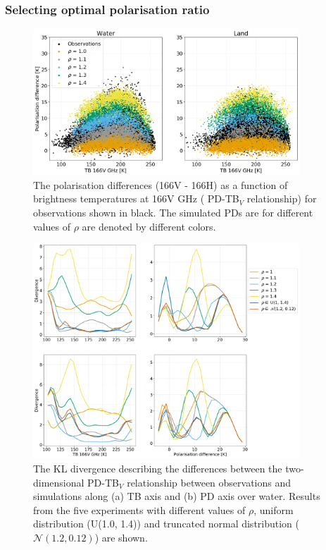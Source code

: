 \documentclass[amt, manuscript]{copernicus}
\begin{document}
\subsubsection{Selecting optimal polarisation ratio}
%
\label{sec:polratio_selection}
\begin{figure}[t]
	\includegraphics[width=10cm]{Figures/PD_water_varying_rho_water_land.png}
	\caption{The polarisation differences (166V - 166H) as a function of brightness temperatures at 166V GHz ( PD-TB$_V$ relationship) for observations shown in black. The simulated PDs are for different values of $\rho$ are denoted by different colors. }
	\label{fig:PD_166}
\end{figure}
\begin{figure}[t]
	\includegraphics[width=10cm]{Figures/divergence_land_water.pdf}
	\caption{The KL divergence describing the differences between the two-dimensional PD-TB$_V$ relationship between observations and simulations along (a) TB axis and (b) PD axis over water. Results from the five experiments with different values of $\rho$, uniform distribution (U(1.0, 1.4)) and truncated normal distribution ($\mathcal{N(1.2, 0.12)}$) are shown. }
	\label{fig:divergence_PD_land_water}
\end{figure}
\end{document}
